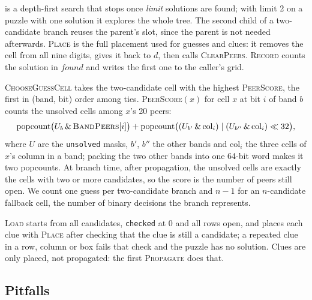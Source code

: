 \documentclass[11pt]{article}
\theoremstyle{definition}
\theoremstyle{plain}
\let\origtextsc\textsc
\renewcommand{\textsc}[1]{\textup{\origtextsc{#1}}}
\begin{document}
 is a depth-first search that stops once \emph{limit} solutions are found; with limit 2 on a puzzle
with one solution it explores the whole tree. The second child of a two-candidate branch reuses the parent's slot,
since the parent is not needed afterwards. \textsc{Place} is the full placement used for guesses and clues: it removes
the cell from all nine digits, gives it back to $d$, then calls \textsc{ClearPeers}. \textsc{Record} counts the solution
in $\mathit{found}$ and writes the first one to the caller's grid.

\textsc{ChooseGuessCell} takes the two-candidate cell with the highest \textsc{PeerScore}, the first in (band, bit)
order among ties. \textsc{PeerScore}$(x)$ for cell $x$ at bit $i$ of band $b$ counts the unsolved cells among $x$'s 20 peers:
\[
\mathrm{popcount}\bigl(U_b \,\&\, \textsc{BandPeers}[i]\bigr) + \mathrm{popcount}\bigl((U_{b'} \,\&\, \mathrm{col}_i) \mid
(U_{b''} \,\&\, \mathrm{col}_i)\ll 32\bigr),
\]
where $U$ are the \texttt{unsolved} masks, $b'$, $b''$ the other bands and $\mathrm{col}_i$ the three cells of $x$'s
column in a band; packing the two other bands into one 64-bit word makes it two popcounts. At branch time, after
propagation, the unsolved cells are exactly the cells with two or more candidates, so the score is the number of
peers still open. We count one guess per two-candidate branch and $n-1$ for an $n$-candidate fallback cell, the
number of binary decisions the branch represents.

\textsc{Load} starts from all candidates, \texttt{checked} at 0 and all rows open, and places each clue with
\textsc{Place} after checking that the clue is still a candidate; a repeated clue in a row, column or box fails that
check and the puzzle has no solution. Clues are only placed, not propagated: the first \textsc{Propagate} does that.

\subsection{Pitfalls}
\label{sec:pitfalls}
\end{document}
